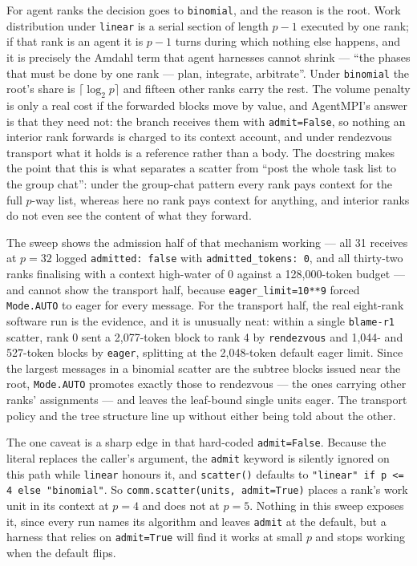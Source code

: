 \documentclass[11pt]{article}
\begin{document}
For agent ranks the decision goes to \texttt{binomial}, and the reason is the root. Work
distribution under \texttt{linear} is a serial section of length $p-1$ executed by one rank; if
that rank is an agent it is $p-1$ turns during which nothing else happens, and it is precisely the
Amdahl term that agent harnesses cannot shrink --- ``the phases that must be done by one rank ---
plan, integrate, arbitrate''. Under \texttt{binomial} the root's share is $\lceil\log_2 p\rceil$
and fifteen other ranks carry the rest. The volume penalty is only a real cost if the forwarded
blocks move by value, and AgentMPI's answer is that they need not: the branch receives them with
\texttt{admit=False}, so nothing an interior rank forwards is charged to its context account, and
under rendezvous transport what it holds is a reference rather than a body. The docstring makes the
point that this is what separates a scatter from ``post the whole task list to the group chat'':
under the group-chat pattern every rank pays context for the full $p$-way list, whereas here no
rank pays context for anything, and interior ranks do not even see the content of what they
forward.

The sweep shows the admission half of that mechanism working --- all 31 receives at $p=32$ logged
\texttt{admitted: false} with \texttt{admitted\_tokens: 0}, and all thirty-two ranks finalising
with a context high-water of 0 against a 128,000-token budget --- and cannot show the transport
half, because \texttt{eager\_limit=10**9} forced \texttt{Mode.AUTO} to eager for every message.
For the transport half, the real eight-rank software run is the evidence, and it is unusually neat:
within a single \texttt{blame-r1} scatter, rank 0 sent a 2,077-token block to rank 4 by
\texttt{rendezvous} and 1,044- and 527-token blocks by \texttt{eager}, splitting at the
2,048-token default eager limit. Since the largest messages in a binomial scatter are the
subtree blocks issued near the root, \texttt{Mode.AUTO} promotes exactly those to rendezvous ---
the ones carrying other ranks' assignments --- and leaves the leaf-bound single units eager. The
transport policy and the tree structure line up without either being told about the other.

The one caveat is a sharp edge in that hard-coded \texttt{admit=False}. Because the literal
replaces the caller's argument, the \texttt{admit} keyword is silently ignored on this path while
\texttt{linear} honours it, and \texttt{scatter()} defaults to
\texttt{"linear" if p <= 4 else "binomial"}. So \texttt{comm.scatter(units, admit=True)} places a
rank's work unit in its context at $p=4$ and does not at $p=5$. Nothing in this sweep exposes it,
since every run names its algorithm and leaves \texttt{admit} at the default, but a harness that
relies on \texttt{admit=True} will find it works at small $p$ and stops working when the default
flips.
\end{document}
